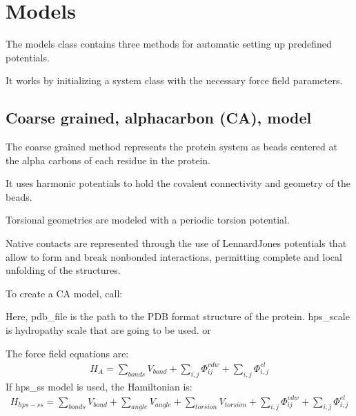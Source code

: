 \documentclass[letterpaper,10pt,english]{sphinxmanual}
\begin{document}
\sphinxstepscope


\chapter{Models}
\label{\detokenize{modules/models:models}}\label{\detokenize{modules/models::doc}}
\sphinxAtStartPar
The models class contains three methods for automatic setting up predefined potentials.

\sphinxAtStartPar
It works by initializing a system class with the necessary force field parameters.


\section{Coarse grained, alpha\sphinxhyphen{}carbon (CA), model}
\label{\detokenize{modules/models:coarse-grained-alpha-carbon-ca-model}}
\sphinxAtStartPar
The coarse grained method represents the protein system as beads centered at the alpha carbons of each residue in the protein.

\sphinxAtStartPar
It uses harmonic potentials to hold the covalent connectivity and geometry of the beads.

\sphinxAtStartPar
Torsional geometries are modeled with a periodic torsion potential.

\sphinxAtStartPar
Native contacts are represented through the use of Lennard\sphinxhyphen{}Jones potentials that allow to form and break non\sphinxhyphen{}bonded interactions, permitting complete and local unfolding of the structures.

\sphinxAtStartPar
To create a CA model, call:

\sphinxAtStartPar
Here, pdb\_file is the path to the PDB format structure of the protein.
hps\_scale is hydropathy scale that are going to be used.  or 

\sphinxAtStartPar
The force field equations are:
\begin{equation*}
\begin{split}H_A = \sum_{bonds}V_{bond}+\sum_{i,j}\Phi_{ij}^{vdw}+\sum_{i,j}\Phi_{i,j}^{el}\end{split}
\end{equation*}
\sphinxAtStartPar
If hps\_ss model is used, the Hamiltonian is:
\begin{equation*}
\begin{split}H_{hps-ss} = \sum_{bonds}V_{bond}+\sum_{angle}V_{angle}+\sum_{torsion}V_{torsion}+\sum_{i,j}\Phi_{ij}^{vdw}+\sum_{i,j}\Phi_{i,j}^{el}\end{split}
\end{equation*}
\end{document}
